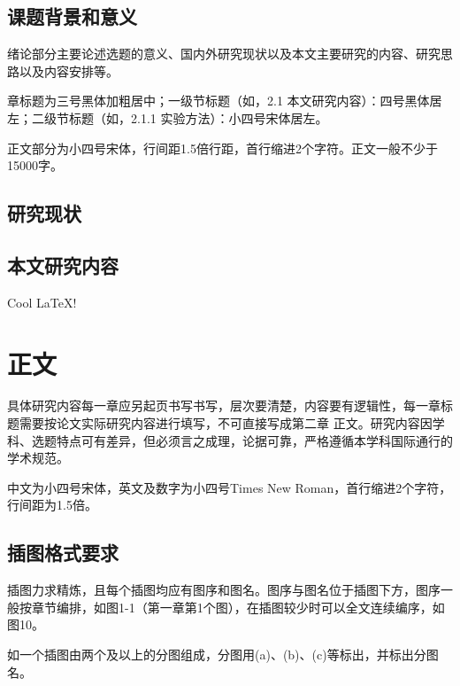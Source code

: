 \documentclass[fontset = mac ms]{seuthesis2024b}
\begin{document}



    \section{课题背景和意义}
      绪论部分主要论述选题的意义、国内外研究现状以及本文主要研究的内容、研究思路以及内容安排等。

      章标题为三号黑体加粗居中；一级节标题（如，2.1 本文研究内容）：四号黑体居左；二级节标题（如，2.1.1 实验方法）：小四号宋体居左。

      正文部分为小四号宋体，行间距1.5倍行距，首行缩进2个字符。正文一般不少于15000字。

    \section{研究现状}

    \section{本文研究内容}

      Cool \LaTeX{}!

      \lipsum

    \chapter{正文}

      具体研究内容每一章应另起页书写书写，层次要清楚，内容要有逻辑性，每一章标题需要按论文实际研究内容进行填写，不可直接写成第二章 正文。研究内容因学科、选题特点可有差异，但必须言之成理，论据可靠，严格遵循本学科国际通行的学术规范。

      中文为小四号宋体，英文及数字为小四号Times New Roman，首行缩进2个字符，行间距为1.5倍。

    \section{插图格式要求}

      插图力求精炼，且每个插图均应有图序和图名。图序与图名位于插图下方，图序一般按章节编排，如图1-1（第一章第1个图），在插图较少时可以全文连续编序，如图10。
      
      如一个插图由两个及以上的分图组成，分图用(a)、(b)、(c)等标出，并标出分图名。
\end{document}
